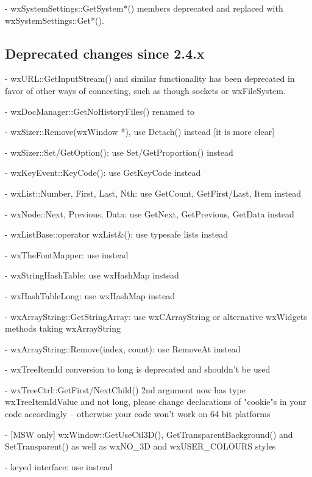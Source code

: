 - wxSystemSettings::GetSystem*() members deprecated and replaced with wxSystemSettings::Get*().


\subsection{Deprecated changes since 2.4.x}\label{deprecatedsince24}

- wxURL::GetInputStream() and similar functionality has been deprecated in
  favor of other ways of connecting, such as though sockets or wxFileSystem.

- wxDocManager::GetNoHistoryFiles() renamed to 

- wxSizer::Remove(wxWindow *), use Detach() instead [it is more clear]

- wxSizer::Set/GetOption(): use Set/GetProportion() instead

- wxKeyEvent::KeyCode(): use GetKeyCode instead

- wxList::Number, First, Last, Nth: use GetCount, GetFirst/Last, Item instead

- wxNode::Next, Previous, Data: use GetNext, GetPrevious, GetData instead

- wxListBase::operator wxList&(): use typesafe lists instead

- wxTheFontMapper: use  instead

- wxStringHashTable: use wxHashMap instead

- wxHashTableLong: use wxHashMap instead

- wxArrayString::GetStringArray: use wxCArrayString or alternative wxWidgets
                                 methods taking wxArrayString

- wxArrayString::Remove(index, count): use RemoveAt instead

- wxTreeItemId conversion to long is deprecated and shouldn't be used

- wxTreeCtrl::GetFirst/NextChild() 2nd argument now has type wxTreeItemIdValue
  and not long, please change declarations of "cookie"s in your code
  accordingly -- otherwise your code won't work on 64 bit platforms

- [MSW only] wxWindow::GetUseCtl3D(), GetTransparentBackground() and
             SetTransparent() as well as wxNO\_3D and wxUSER\_COLOURS styles

-  keyed interface: use  instead


